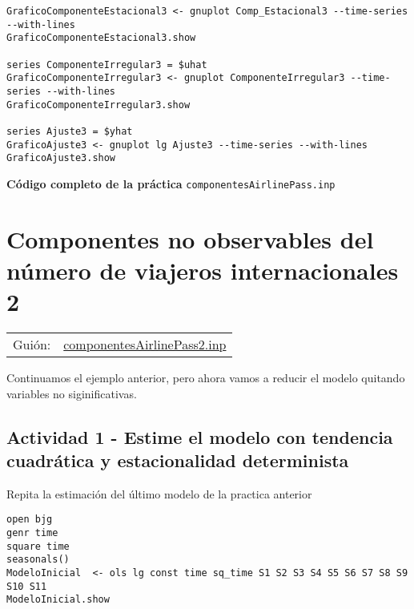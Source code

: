 \documentclass[11pt]{article}
\begin{document}
\begin{enumerate}
\begin{itemize}
{\begin{verbatim}
GraficoComponenteEstacional3 <- gnuplot Comp_Estacional3 --time-series --with-lines
GraficoComponenteEstacional3.show

series ComponenteIrregular3 = $uhat
GraficoComponenteIrregular3 <- gnuplot ComponenteIrregular3 --time-series --with-lines
GraficoComponenteIrregular3.show

series Ajuste3 = $yhat
GraficoAjuste3 <- gnuplot lg Ajuste3 --time-series --with-lines
GraficoAjuste3.show
\end{verbatim}
}
\end{itemize}


\vspace{10pt}
\noindent
\textbf{Código completo de la práctica} \texttt{componentesAirlinePass.inp}
\vspace{10pt}

\clearpage
\end{enumerate}


\section{Componentes no observables del número de viajeros internacionales 2}
\label{sec:org1195691}
\begin{center}
\begin{tabular}{ll}
Guión: & \href{https://github.com/mbujosab/Ectr/tree/master/Practicas/Gretl/scripts/componentesAirlinePass2.inp}{componentesAirlinePass2.inp}\\
\end{tabular}
\end{center}

Continuamos el ejemplo anterior, pero ahora vamos a reducir el modelo
quitando variables no siginificativas.

\subsection{Actividad 1 - Estime el modelo con tendencia cuadrática y estacionalidad determinista}
\label{sec:org50846af}

Repita la estimación del último modelo de la practica anterior

{\vspace{0pt} \footnotesize \color{gray!70!black}
\begin{verbatim}
open bjg
genr time
square time
seasonals()
ModeloInicial  <- ols lg const time sq_time S1 S2 S3 S4 S5 S6 S7 S8 S9 S10 S11
ModeloInicial.show
\end{verbatim}
}
\end{document}
